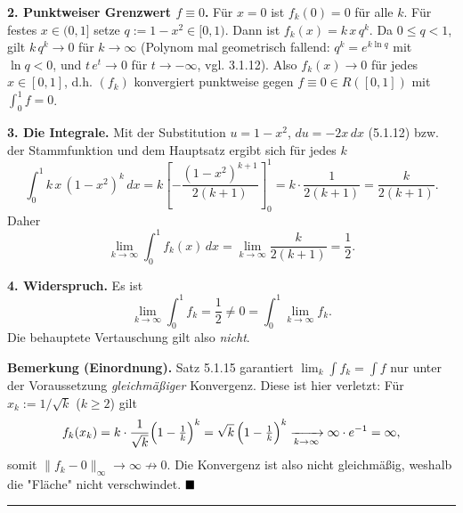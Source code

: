 \documentclass[a4paper,11pt]{article}
\providecommand{\qed}{\hfill\ensuremath{\blacksquare}}
\begin{document}
\textbf{2. Punktweiser Grenzwert $f\equiv 0$.} Für $x=0$ ist $f_k(0)=0$ für alle $k$. Für festes $x\in(0,1]$ setze $q:=1-x^2\in[0,1)$. Dann ist $f_k(x)=k\,x\,q^{k}$. Da $0\le q<1$, gilt $k\,q^{k}\to 0$ für $k\to\infty$ (Polynom mal geometrisch fallend: $q^k=e^{k\ln q}$ mit $\ln q<0$, und $t\,e^{t}\to 0$ für $t\to-\infty$, vgl. 3.1.12). Also $f_k(x)\to 0$ für jedes $x\in[0,1]$, d.h. $(f_k)$ konvergiert punktweise gegen $f\equiv 0\in R([0,1])$ mit $\int_0^1 f=0$.

\textbf{3. Die Integrale.} Mit der Substitution $u=1-x^2$, $du=-2x\,dx$ (5.1.12) bzw. der Stammfunktion und dem Hauptsatz ergibt sich für jedes $k$
\[ \int_0^1 k\,x\,(1-x^2)^k\,dx = k\left[-\frac{(1-x^2)^{k+1}}{2(k+1)}\right]_0^1 = k\cdot\frac{1}{2(k+1)} = \frac{k}{2(k+1)}. \]
Daher
\[ \lim_{k\to\infty}\int_0^1 f_k(x)\,dx = \lim_{k\to\infty}\frac{k}{2(k+1)} = \frac{1}{2}. \]

\textbf{4. Widerspruch.} Es ist
\[ \lim_{k\to\infty}\int_0^1 f_k = \frac{1}{2}\neq 0 = \int_0^1 \lim_{k\to\infty} f_k. \]
Die behauptete Vertauschung gilt also \emph{nicht}.

\textbf{Bemerkung (Einordnung).} Satz 5.1.15 garantiert $\lim_k\int f_k=\int f$ nur unter der Voraussetzung \emph{gleichmäßiger} Konvergenz. Diese ist hier verletzt: Für $x_k:=1/\sqrt{k}$ ($k\ge 2$) gilt
\[ f_k(x_k)=k\cdot\frac{1}{\sqrt k}\Bigl(1-\tfrac1k\Bigr)^{k}=\sqrt{k}\,\Bigl(1-\tfrac1k\Bigr)^{k}\xrightarrow[k\to\infty]{}\infty\cdot e^{-1}=\infty, \]
somit $\|f_k-0\|_\infty\to\infty\not\to 0$. Die Konvergenz ist also nicht gleichmäßig, weshalb die "Fläche" nicht verschwindet. $\qed$\par\bigskip\hrule\bigskip
\end{document}
